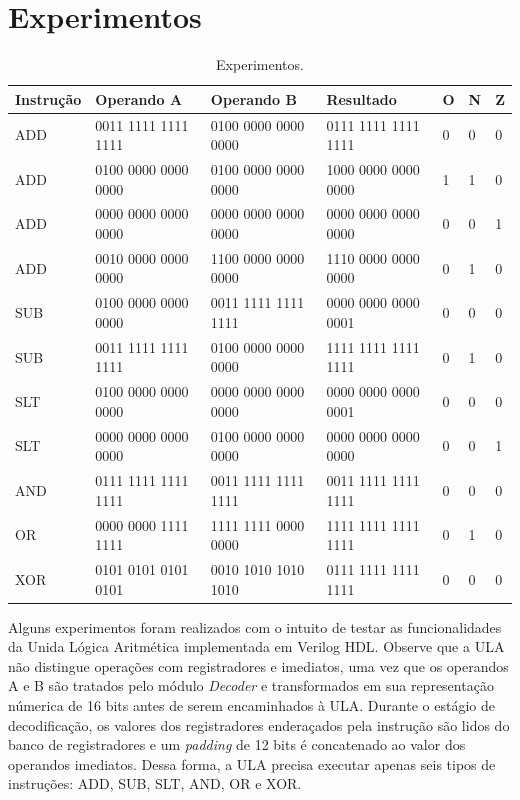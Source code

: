 \documentclass[11pt,a4paper,titlepage]{article}
\begin{document}
\section{Experimentos}

\begin{table}[h]
\centering
\begin{tabular}{|l|l|l|l|l|l|l|}
\hline
Instrução & Operando A & Operando B & Resultado & O & N & Z \\
\hline
ADD & 0011 1111 1111 1111 & 0100 0000 0000 0000 & 0111 1111 1111 1111 & 0 & 0 & 0 \\
ADD & 0100 0000 0000 0000 & 0100 0000 0000 0000 & 1000 0000 0000 0000 & 1 & 1 & 0 \\
ADD & 0000 0000 0000 0000 & 0000 0000 0000 0000 & 0000 0000 0000 0000 & 0 & 0 & 1 \\
ADD & 0010 0000 0000 0000 & 1100 0000 0000 0000 & 1110 0000 0000 0000 & 0 & 1 & 0 \\
SUB & 0100 0000 0000 0000 & 0011 1111 1111 1111 & 0000 0000 0000 0001 & 0 & 0 & 0 \\
SUB & 0011 1111 1111 1111 & 0100 0000 0000 0000 & 1111 1111 1111 1111 & 0 & 1 & 0 \\
SLT & 0100 0000 0000 0000 & 0000 0000 0000 0000 & 0000 0000 0000 0001 & 0 & 0 & 0 \\
SLT & 0000 0000 0000 0000 & 0100 0000 0000 0000 & 0000 0000 0000 0000 & 0 & 0 & 1 \\
AND & 0111 1111 1111 1111 & 0011 1111 1111 1111 & 0011 1111 1111 1111 & 0 & 0 & 0 \\
OR  & 0000 0000 1111 1111 & 1111 1111 0000 0000 & 1111 1111 1111 1111 & 0 & 1 & 0 \\
XOR & 0101 0101 0101 0101 & 0010 1010 1010 1010 & 0111 1111 1111 1111 & 0 & 0 & 0 \\
\hline

\end{tabular}
\caption{Experimentos.}
\label{tab:experiments}
\end{table}
%

Alguns experimentos foram realizados com o intuito de testar as funcionalidades da Unida Lógica Aritmética
implementada em Verilog HDL. Observe que a ULA não distingue operações com registradores e imediatos, uma 
vez que os operandos A e B são tratados pelo módulo \textit{Decoder} e transformados em sua representação 
númerica de 16 bits antes de serem encaminhados à ULA. Durante o estágio de decodificação, os valores dos 
registradores enderaçados pela instrução são lidos do banco de registradores e um \textit{padding} de 12 
bits é concatenado ao valor dos operandos imediatos. Dessa forma, a ULA precisa executar apenas seis tipos 
de instruções: ADD, SUB, SLT, AND, OR e XOR. 
\end{document}
